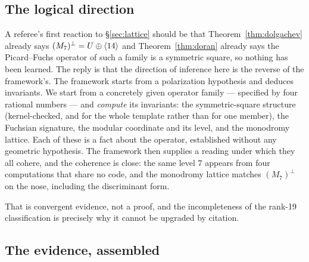 \subsection{The logical direction}

A referee's first reaction to \S\ref{sec:lattice} should be that
Theorem~\ref{thm:dolgachev} already says $(M_7)^{\perp} = U\oplus\langle 14\rangle$
and Theorem~\ref{thm:doran} already says the Picard--Fuchs operator of such a
family is a symmetric square, so nothing has been learned. The reply is that
the direction of inference here is the reverse of the framework's. The
framework starts from a polarization hypothesis and deduces invariants. We
start from a concretely given operator family --- specified by four rational
numbers --- and \emph{compute} its invariants: the symmetric-square structure
(kernel-checked, and for the whole template rather than for one member), the
Fuchsian signature, the modular coordinate and its level, and the monodromy
lattice. Each of these is a fact about the operator, established without any
geometric hypothesis. The framework then supplies a reading under which they
all cohere, and the coherence is close: the same level $7$ appears from four
computations that share no code, and the monodromy lattice matches
$(M_7)^{\perp}$ on the nose, including the discriminant form.

That is convergent evidence, not a proof, and the incompleteness of the
rank-19 classification is precisely why it cannot be upgraded by citation.

\subsection{The evidence, assembled}

